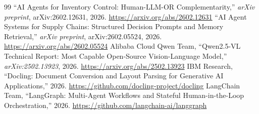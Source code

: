 \documentclass[11pt,a4paper]{article}
\begin{document}
\begin{thebibliography}{99}
\small
\setlength{\itemsep}{0.2pt}
\setlength{\parskip}{0pt}
 ``AI Agents for Inventory Control: Human-LLM-OR Complementarity,'' \textit{arXiv preprint}, arXiv:2602.12631, 2026. \url{https://arxiv.org/abs/2602.12631}
 ``AI Agent Systems for Supply Chains: Structured Decision Prompts and Memory Retrieval,'' \textit{arXiv preprint}, arXiv:2602.05524, 2026. \url{https://arxiv.org/abs/2602.05524}
 Alibaba Cloud Qwen Team, ``Qwen2.5-VL Technical Report: Most Capable Open-Source Vision-Language Model,'' \textit{arXiv:2502.13923}, 2026. \url{https://arxiv.org/abs/2502.13923}
 IBM Research, ``Docling: Document Conversion and Layout Parsing for Generative AI Applications,'' 2026. \url{https://github.com/docling-project/docling}
 LangChain Team, ``LangGraph: Multi-Agent Workflows and Stateful Human-in-the-Loop Orchestration,'' 2026. \url{https://github.com/langchain-ai/langgraph}
\end{thebibliography}
\end{document}
